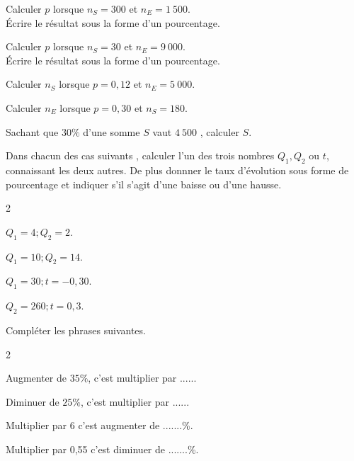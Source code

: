 \documentclass[11pt,a4paper]{article}  %
\begin{document}
\begin{enumMet}
	\item Calculer $p$ lorsque $n_S = 300$ et $n_E = 1\ 500$.\\
	Écrire le résultat sous la forme d'un pourcentage.
	\item {} Calculer $p$ lorsque $n_S = 30$ et $n_E= 9\ 000$.\\
	Écrire le résultat sous la forme d'un pourcentage.
	\item Calculer $n_S$ lorsque $p = 0,12$ et $n_E= 5\ 000$.
	\item Calculer $n_E$ lorsque $p = 0,30$ et $n_S = 180$.
	\item Sachant que $30 \%$ d'une somme $S$ vaut $4\ 500$ \EUR{}, calculer $S$.
\end{enumMet}

Dans chacun des cas suivants , calculer l'un des trois nombres $Q_{1}, Q_{2}$ ou $t$, connaissant les deux autres. De plus donnner le taux d'évolution sous forme de pourcentage et indiquer s'il s'agit d'une baisse ou d'une hausse.
	\begin{multicols}{2}
		\begin{enumMet}
		\item {} $Q_{1}=4 ; Q_{2}=2$.
		\item $Q_{1}=10 ; Q_{2}=14$.
		\item $Q_{1}=30 ; t=-0,30$.
		\item $Q_{2}=260 ; t=0,3$.
	\end{enumMet}
	\end{multicols}


Compléter les phrases suivantes.
\begin{multicols}{2}
	\begin{enumMet}
	\item Augmenter de $35 \%$, c'est multiplier par ......
	\item Diminuer de $25 \%$, c'est multiplier par ......
	\item Multiplier par 6 c'est augmenter de .......\%.
	\item Multiplier par 0,55 c'est diminuer de .......\%.	
\end{enumMet}
\end{multicols}
\end{document}
